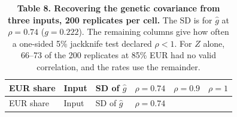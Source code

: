 \documentclass[11pt,a4paper]{article}
\begin{document}
\begin{longtable}[]{@{}
  >{\raggedright\arraybackslash}p{}
  >{\raggedright\arraybackslash}p{}
  >{\raggedleft\arraybackslash}p{}
  >{\raggedleft\arraybackslash}p{}
  >{\raggedleft\arraybackslash}p{}
  >{\raggedleft\arraybackslash}p{}@{}}
\caption{\textbf{Table 8. Recovering the genetic covariance from three inputs, 200 replicates per cell.} The SD is for \(\hat g\) at \(\rho=0.74\) (\(g=0.222\)). The remaining columns give how often a one-sided 5\% jackknife test declared \(\rho<1\). For \(Z\) alone, 66--73 of the 200 replicates at 85\% EUR had no valid correlation, and the rates use the remainder.}\tabularnewline
\toprule\noalign{}
\begin{minipage}[b]{\linewidth}\raggedright
EUR share
\end{minipage} & \begin{minipage}[b]{\linewidth}\raggedright
Input
\end{minipage} & \begin{minipage}[b]{\linewidth}\raggedleft
SD of \(\hat g\)
\end{minipage} & \begin{minipage}[b]{\linewidth}\raggedleft
\(\rho=0.74\)
\end{minipage} & \begin{minipage}[b]{\linewidth}\raggedleft
\(\rho=0.9\)
\end{minipage} & \begin{minipage}[b]{\linewidth}\raggedleft
\(\rho=1\)
\end{minipage} \\
\midrule\noalign{}
\endfirsthead
\toprule\noalign{}
\begin{minipage}[b]{\linewidth}\raggedright
EUR share
\end{minipage} & \begin{minipage}[b]{\linewidth}\raggedright
Input
\end{minipage} & \begin{minipage}[b]{\linewidth}\raggedleft
SD of \(\hat g\)
\end{minipage} & \begin{minipage}[b]{\linewidth}\raggedleft
\(\rho=0.74\)
\end{minipage} & \begin{minipage}[b]{\linewidth}\raggedleft

\end{minipage}
\end{longtable}
\end{document}
